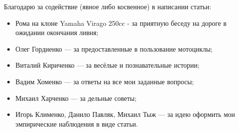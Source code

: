 \documentclass[12pt,a4paper]{article}
\begin{document}
Благодарю за содействие (явное либо косвенное) в написании статьи:

\begin{itemize}
\item Рома на клоне Yamaha Virago 250cc - за приятную беседу на дороге
в ожидании окончания ливня;
\item Олег Гордиенко --- за предоставленные в пользование мотоциклы;
\item Виталий Кириченко --- за весёлые и познавательные истории;
\item Вадим Хоменко --- за ответы на все мои заданные вопросы;
\item Михаил Харченко --- за дельные советы;
\item Игорь Клименко, Данило Павляк, Михаил Тыж --- за идею оформить
мои эмпирические наблюдения в виде статьи.
\end{itemize}
\end{document}
